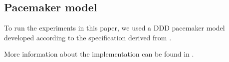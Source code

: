 \subsection{Pacemaker model}
\label{pacemakerModel}

To run the experiments in this paper, we used a DDD pacemaker model developed according to the specification derived from \cite{challenge}.

More information about the implementation can be found in \cite{STTT13}. 

%
%
%
%
%
